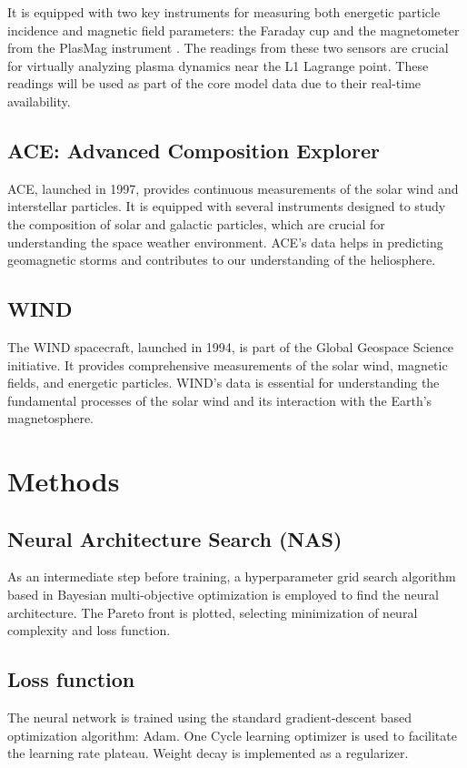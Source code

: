\documentclass[12pt]{article}
\begin{document}
It is equipped with two key instruments for measuring both energetic particle incidence and magnetic field parameters: the Faraday cup and the magnetometer from the PlasMag instrument \cite{nasa_dscovr}. The readings from these two sensors are crucial for virtually analyzing plasma dynamics near the L1 Lagrange point. These readings will be used as part of the core model data due to their real-time availability.

\subsection{ACE: Advanced Composition Explorer}
ACE, launched in 1997, provides continuous measurements of the solar wind and interstellar particles. It is equipped with several instruments designed to study the composition of solar and galactic particles, which are crucial for understanding the space weather environment. ACE's data helps in predicting geomagnetic storms and contributes to our understanding of the heliosphere.

\subsection{WIND}
The WIND spacecraft, launched in 1994, is part of the Global Geospace Science initiative. It provides comprehensive measurements of the solar wind, magnetic fields, and energetic particles. WIND's data is essential for understanding the fundamental processes of the solar wind and its interaction with the Earth's magnetosphere.

\section{Methods}

\subsection{Neural Architecture Search (NAS)}
As an intermediate step before training, a hyperparameter grid search algorithm based in Bayesian multi-objective optimization is employed to find the neural architecture. The Pareto front is plotted, selecting minimization of neural complexity and loss function.

\subsection{Loss function}
The neural network is trained using the standard gradient-descent based optimization algorithm: Adam. One Cycle learning optimizer is used to facilitate the learning rate plateau. Weight decay is implemented as a regularizer.
\end{document}
